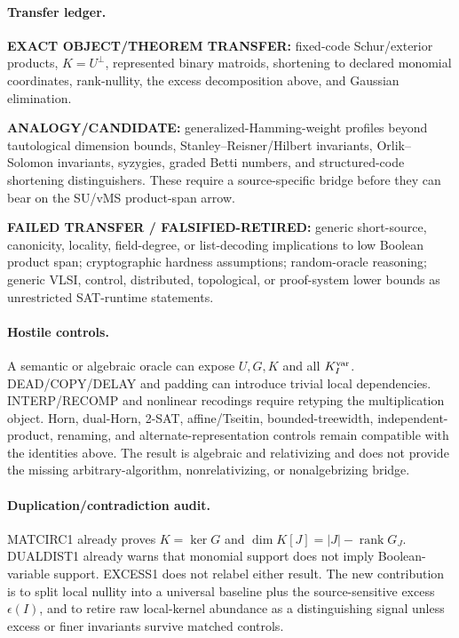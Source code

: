 \documentclass[11pt]{article}
\begin{document}
\paragraph{Transfer ledger.}
\textbf{EXACT OBJECT/THEOREM TRANSFER:} fixed-code Schur/exterior products, \(K=U^\perp\), represented binary matroids, shortening to declared monomial coordinates, rank-nullity, the excess decomposition above, and Gaussian elimination.

\textbf{ANALOGY/CANDIDATE:} generalized-Hamming-weight profiles beyond tautological dimension bounds, Stanley--Reisner/Hilbert invariants, Orlik--Solomon invariants, syzygies, graded Betti numbers, and structured-code shortening distinguishers. These require a source-specific bridge before they can bear on the SU/vMS product-span arrow.

\textbf{FAILED TRANSFER / FALSIFIED-RETIRED:} generic short-source, canonicity, locality, field-degree, or list-decoding implications to low Boolean product span; cryptographic hardness assumptions; random-oracle reasoning; generic VLSI, control, distributed, topological, or proof-system lower bounds as unrestricted SAT-runtime statements.

\paragraph{Hostile controls.}
A semantic or algebraic oracle can expose \(U,G,K\) and all \(K_I^{\rm var}\). DEAD/COPY/DELAY and padding can introduce trivial local dependencies. INTERP/RECOMP and nonlinear recodings require retyping the multiplication object. Horn, dual-Horn, 2-SAT, affine/Tseitin, bounded-treewidth, independent-product, renaming, and alternate-representation controls remain compatible with the identities above. The result is algebraic and relativizing and does not provide the missing arbitrary-algorithm, nonrelativizing, or nonalgebrizing bridge.

\paragraph{Duplication/contradiction audit.}
MATCIRC1 already proves \(K=\ker G\) and \(\dim K[J]=|J|-\operatorname{rank}G_J\). DUALDIST1 already warns that monomial support does not imply Boolean-variable support. EXCESS1 does not relabel either result. The new contribution is to split local nullity into a universal baseline plus the source-sensitive excess \(\epsilon(I)\), and to retire raw local-kernel abundance as a distinguishing signal unless excess or finer invariants survive matched controls.
\end{document}
